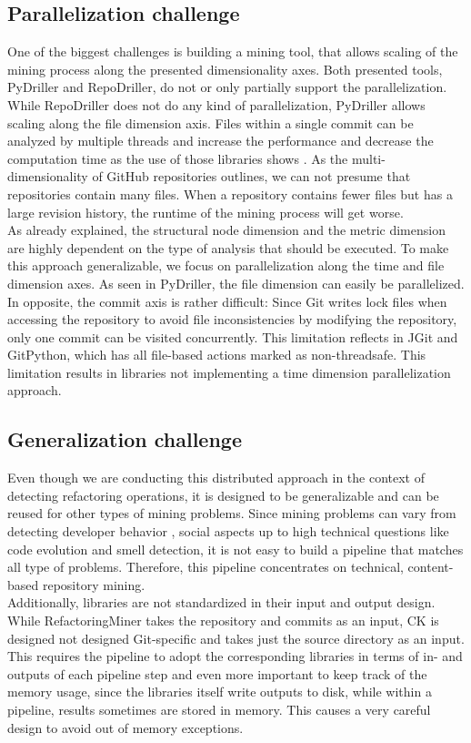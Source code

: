 \subsection{Parallelization challenge}
One of the biggest challenges is building a mining tool, that allows scaling of the mining process along the presented dimensionality axes. Both presented tools, PyDriller and RepoDriller, do not or only partially support the parallelization. While RepoDriller does not do any kind of parallelization, PyDriller allows scaling along the file dimension axis. Files within a single commit can be analyzed by multiple threads and increase the performance and decrease the computation time as the use of those libraries shows \cite{Gote2019}. As the multi-dimensionality of GitHub repositories outlines, we can not presume that repositories contain many files. When a repository contains fewer files but has a large revision history, the runtime of the mining process will get worse.\\
As already explained, the structural node dimension and the metric dimension are highly dependent on the type of analysis that should be executed. To make this approach generalizable, we focus on parallelization along the time and file dimension axes. As seen in PyDriller, the file dimension can easily be parallelized. In opposite, the commit axis is rather difficult: Since Git writes lock files when accessing the repository to avoid file inconsistencies by modifying the repository, only one commit can be visited concurrently. This limitation reflects in JGit and GitPython, which has all file-based actions marked as non-threadsafe. This limitation results in libraries not implementing a time dimension parallelization approach.

\subsection{Generalization challenge}
Even though we are conducting this distributed approach in the context of detecting refactoring operations, it is designed to be generalizable and can be reused for other types of mining problems. Since mining problems can vary from detecting developer behavior \cite{}, social aspects \cite{} up to high technical questions like code evolution \cite{} and smell detection\cite{}, it is not easy to build a pipeline that matches all type of problems. Therefore, this pipeline concentrates on technical, content-based repository mining.\\
Additionally, libraries are not standardized in their input and output design. While RefactoringMiner takes the repository and commits as an input, CK is designed not designed Git-specific and takes just the source directory as an input. This requires the pipeline to adopt the corresponding libraries in terms of in- and outputs of each pipeline step and even more important to keep track of the memory usage, since the libraries itself write outputs to disk, while within a pipeline, results sometimes are stored in memory. This causes a very careful design to avoid out of memory exceptions.
